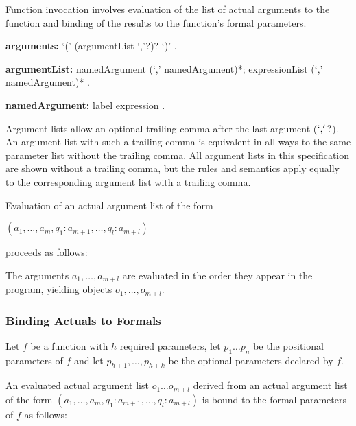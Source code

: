 \documentclass{article}
\begin{document}
\LMHash{}
Function invocation involves evaluation of the list of actual arguments to the function and binding of the results to the function's formal parameters.

\begin{grammar}
{\bf arguments:}
      `(' (argumentList  `,'?)? `)'
    .

{\bf argumentList:}
      namedArgument (`,' namedArgument)*;
      expressionList (`,' namedArgument)*
    .

{\bf namedArgument:}
      label expression %
    .
 \end{grammar}

Argument lists allow an optional trailing comma after the last argument ($`,'?$). An argument list with such a trailing comma is equivalent in all ways to the same parameter list without the trailing comma. All argument lists in this specification are shown without a trailing comma, but the rules and semantics apply equally to the corresponding argument list with a trailing comma.

\LMHash{}
Evaluation of an actual argument list of the form

$(a_1, \ldots, a_m, q_1: a_{m+1}, \ldots, q_l: a_{m+l})$

proceeds as follows:

\LMHash{}
The arguments $a_1, \ldots, a_{m+l}$ are evaluated in the order they appear in the program, yielding objects $o_1, \ldots, o_{m+l}$.



\subsubsection{ Binding Actuals to Formals}

\LMHash{}
Let $f$ be a function with $h$ required parameters,  let $p_1 \ldots p_n$ be the positional parameters of $f$ and let $p_{h+1}, \ldots, p_{h+k}$ be the optional parameters declared by $f$.

\LMHash{}
An evaluated actual argument list $o_1 \ldots o_{m+l}$ derived from an actual argument list of the form $(a_1, \ldots, a_m, q_1: a_{m+1}, \ldots, q_l: a_{m+l})$ is bound to the formal parameters of $f$ as follows:

\end{document}
